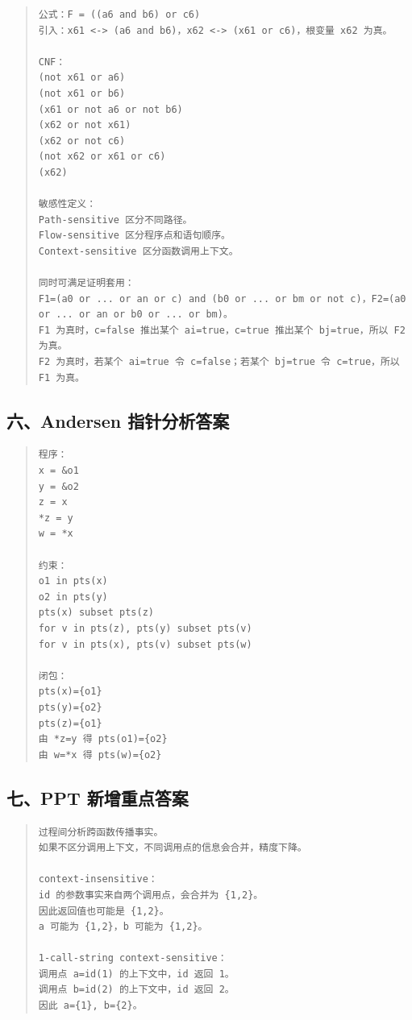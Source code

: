 \documentclass[UTF8,zihao=-4]{ctexart}
\begin{document}
\begin{quote}
\footnotesize
\begin{verbatim}
公式：F = ((a6 and b6) or c6)
引入：x61 <-> (a6 and b6)，x62 <-> (x61 or c6)，根变量 x62 为真。

CNF：
(not x61 or a6)
(not x61 or b6)
(x61 or not a6 or not b6)
(x62 or not x61)
(x62 or not c6)
(not x62 or x61 or c6)
(x62)

敏感性定义：
Path-sensitive 区分不同路径。
Flow-sensitive 区分程序点和语句顺序。
Context-sensitive 区分函数调用上下文。

同时可满足证明套用：
F1=(a0 or ... or an or c) and (b0 or ... or bm or not c)，F2=(a0 or ... or an or b0 or ... or bm)。
F1 为真时，c=false 推出某个 ai=true，c=true 推出某个 bj=true，所以 F2 为真。
F2 为真时，若某个 ai=true 令 c=false；若某个 bj=true 令 c=true，所以 F1 为真。
\end{verbatim}
\end{quote}



\subsection{六、Andersen 指针分析答案}


\begin{quote}
\footnotesize
\begin{verbatim}
程序：
x = &o1
y = &o2
z = x
*z = y
w = *x

约束：
o1 in pts(x)
o2 in pts(y)
pts(x) subset pts(z)
for v in pts(z), pts(y) subset pts(v)
for v in pts(x), pts(v) subset pts(w)

闭包：
pts(x)={o1}
pts(y)={o2}
pts(z)={o1}
由 *z=y 得 pts(o1)={o2}
由 w=*x 得 pts(w)={o2}
\end{verbatim}
\end{quote}



\subsection{七、PPT 新增重点答案}


\begin{quote}
\footnotesize
\begin{verbatim}
过程间分析跨函数传播事实。
如果不区分调用上下文，不同调用点的信息会合并，精度下降。

context-insensitive：
id 的参数事实来自两个调用点，会合并为 {1,2}。
因此返回值也可能是 {1,2}。
a 可能为 {1,2}，b 可能为 {1,2}。

1-call-string context-sensitive：
调用点 a=id(1) 的上下文中，id 返回 1。
调用点 b=id(2) 的上下文中，id 返回 2。
因此 a={1}, b={2}。
\end{verbatim}
\end{quote}
\end{document}
